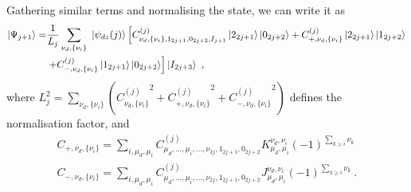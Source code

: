 Gathering similar terms and normalising the state, we can write it as
\begin{equation}\begin{aligned}
	\ket{\Psi_{j+1}} =& \frac{1}{L_j}\sum_{\nu_d,\{\nu_i\}}~\ket{\psi_{dz}(j)}\left[C^{(j)}_{\nu_d,\{\nu_i\},1_{2j+1},0_{2j+2},I_{j+1}}\ket{2_{2j+1}}\ket{0_{2j+2}} + C^{(j)}_{+,\nu_d,\{\nu_i\}}\ket{2_{2j+1}}\ket{1_{2j+2}} \right.\\
					  &\left.+ C^{(j)}_{-,\nu_d,\{\nu_i\}}\ket{1_{2j+1}}\ket{0_{2j+2}}\right]\ket{I_{2j+3}}~,
\end{aligned}\end{equation}
where \(L_j^2 = \sum_{\nu_d,\{\nu_i\}}\left({C^{(j)}_{\nu_d,\{\nu_i\}}}^2 + {C^{(j)}_{+,\nu_d,\{\nu_i\}}}^2 + {C^{(j)}_{-,\nu_d,\{\nu_i\}}}^2\right) \) defines the normalisation factor, and
\begin{equation}\begin{aligned}
C_{+,\nu_d,\{\nu_i\}} = \sum_{i,\mu_d,\mu_i}C^{(j)}_{\mu_d,\ldots,\mu_i,\ldots,\nu_{2j},1_{2j+1},0_{2j+2}}K^{\nu_d,\nu_i}_{\mu_d,\mu_i}(-1)^{\sum_{k\geq i}\nu_k}\\
C_{-,\nu_d,\{\nu_i\}} = \sum_{i,\mu_d,\mu_i}C^{(j)}_{\mu_d,\ldots,\mu_i,\ldots,\nu_{2j},1_{2j+1},0_{2j+2}}J^{\nu_d,\nu_i}_{\mu_d,\mu_i}(-1)^{\sum_{k\geq i}\nu_k}~.
\end{aligned}\end{equation}

